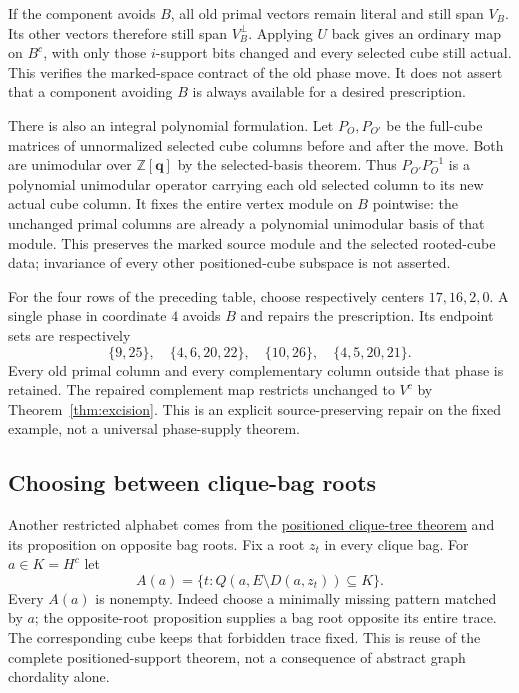 \documentclass[11pt]{article}
\theoremstyle{definition}
\begin{document}
If the component avoids $B$, all old primal vectors remain literal and
still span $V_B$. Its other vectors therefore still span $V_B^\perp$.
Applying $U$ back gives an ordinary map on $B^c$, with only those
$i$-support bits changed and every selected cube still actual. This verifies
the marked-space contract of the old phase move. It does not assert that
a component avoiding $B$ is always available for a desired prescription.

There is also an integral polynomial formulation. Let $P_O,P_{O'}$ be
the full-cube matrices of unnormalized selected cube columns before and
after the move. Both are unimodular over $\mathbb Z[\mathbf q]$ by the
selected-basis theorem. Thus $P_{O'}P_O^{-1}$ is a polynomial unimodular
operator carrying each old selected column to its new actual cube column.
It fixes the entire vertex module on $B$ pointwise: the unchanged primal
columns are already a polynomial unimodular basis of that module.
This preserves the marked source module and the selected rooted-cube data;
invariance of every other positioned-cube subspace is not asserted.

For the four rows of the preceding table, choose respectively centers
$17,16,2,0$. A single phase in coordinate $4$ avoids $B$ and repairs the
prescription. Its endpoint sets are respectively
\[
 \{9,25\},\quad\{4,6,20,22\},\quad
 \{10,26\},\quad\{4,5,20,21\}.
\]
Every old primal column and every complementary column outside that phase
is retained. The repaired complement map restricts unchanged to $V^c$
by Theorem~\ref{thm:excision}. This is an explicit source-preserving
repair on the fixed example, not a universal phase-supply theorem.

\subsection{Choosing between clique-bag roots}
Another restricted alphabet comes from the
\href{../../maxmin-forbidden/sections/chordal_downset_tree.tex}
{positioned clique-tree theorem} and its proposition on opposite bag roots.
Fix a root $z_t$ in every clique bag. For $a\in K=H^c$ let
\[
 A(a)=\{t:Q(a,E\setminus D(a,z_t))\subseteq K\}.
\]
Every $A(a)$ is nonempty. Indeed choose a minimally missing pattern
matched by $a$; the opposite-root proposition supplies a bag root opposite
its entire trace. The corresponding cube keeps that forbidden trace fixed.
This is reuse of the complete positioned-support theorem, not a consequence
of abstract graph chordality alone.
\end{document}
